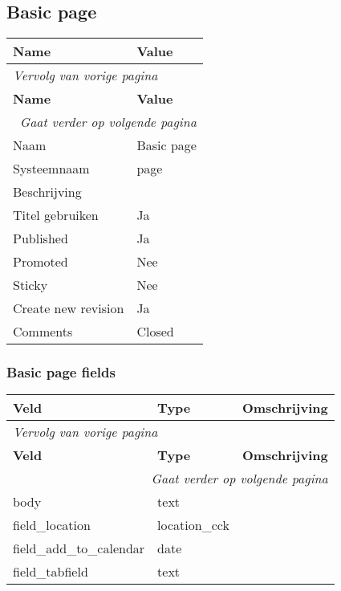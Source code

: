 \subsection{Basic page}
\label{sec:content-basic page}
  \begin{longtable}{| p{7.50cm}|p{7.50cm}|}
  \hline
  \rowcolor{tableheader}
  \textbf{Name} & \textbf{Value}  \tabularnewline
  \hline
\endfirsthead
\multicolumn{2}{l}{\textit{Vervolg van vorige pagina}} \\
\hline
\rowcolor{tableheader}
  \textbf{Name} & \textbf{Value}  \tabularnewline
  \hline
\hline
\endhead
\multicolumn{2}{r}{\textit{Gaat verder op volgende pagina}} \\
\endfoot
\hline
\endlastfoot
  Naam & Basic page  \tabularnewline
  \hline
  Systeemnaam & page  \tabularnewline
  \hline
  Beschrijving &   \tabularnewline
  \hline
  Titel gebruiken & Ja  \tabularnewline
  \hline
  Published & Ja  \tabularnewline
  \hline
  Promoted & Nee  \tabularnewline
  \hline
  Sticky & Nee  \tabularnewline
  \hline
  Create new revision & Ja  \tabularnewline
  \hline
  Comments & Closed  \tabularnewline
  \hline
  \end{longtable}

\subsubsection{Basic page fields}
  \begin{longtable}{| p{5.00cm}|p{5.00cm}|p{5.00cm}|}
  \hline
  \rowcolor{tableheader}
  \textbf{Veld} & \textbf{Type} & \textbf{Omschrijving}  \tabularnewline
  \hline
\endfirsthead
\multicolumn{3}{l}{\textit{Vervolg van vorige pagina}} \\
\hline
\rowcolor{tableheader}
  \textbf{Veld} & \textbf{Type} & \textbf{Omschrijving}  \tabularnewline
  \hline
\hline
\endhead
\multicolumn{3}{r}{\textit{Gaat verder op volgende pagina}} \\
\endfoot
\hline
\endlastfoot
  body & text &   \tabularnewline
  \hline
  field\_location & location\_cck &   \tabularnewline
  \hline
  field\_add\_to\_calendar & date &   \tabularnewline
  \hline
  field\_tabfield & text &   \tabularnewline
  \hline
  \end{longtable}

